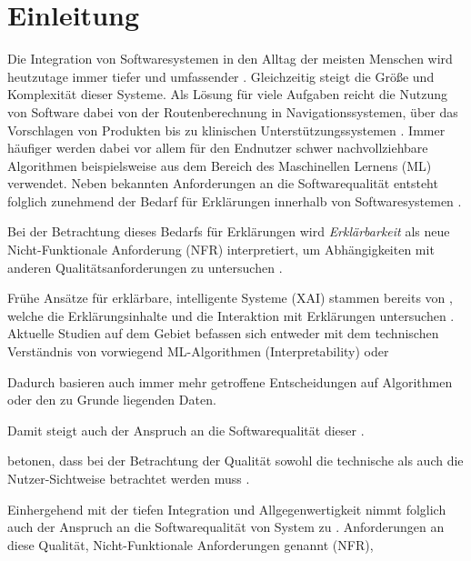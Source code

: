 \chapter{Einleitung}

Die Integration von Softwaresystemen in den Alltag der meisten Menschen wird heutzutage immer tiefer und umfassender \cite{carvalho2020developers}.  Gleichzeitig steigt die Größe und Komplexität dieser Systeme. Als Lösung für viele Aufgaben reicht die Nutzung von Software dabei von der Routenberechnung in Navigationssystemen, über das Vorschlagen von Produkten bis zu klinischen Unterstützungssystemen \cite{chazette2020explainability, tintarev2015explaining, cypko2017guide}. Immer häufiger werden dabei vor allem für den Endnutzer schwer nachvollziehbare Algorithmen beispielsweise aus dem Bereich des Maschinellen Lernens (ML) verwendet. Neben bekannten Anforderungen an die Softwarequalität \cite{international2011iso} entsteht folglich zunehmend der Bedarf für Erklärungen innerhalb von Softwaresystemen \cite{chazette_end-users_nodate}.

Bei der Betrachtung dieses Bedarfs für Erklärungen wird \textit{Erklärbarkeit} als neue Nicht-Funktionale Anforderung (NFR) interpretiert, um Abhängigkeiten mit anderen Qualitätsanforderungen zu untersuchen \cite{chazette2020explainability, kohl_explainability_2019}.

Frühe Ansätze für erklärbare, intelligente Systeme (XAI) stammen bereits von \citeauthor{byrne1991construction, cawsey1991generating}, welche die Erklärungsinhalte \cite{byrne1991construction} und die Interaktion mit Erklärungen untersuchen \cite{cawsey1991generating}. Aktuelle Studien auf dem Gebiet befassen sich entweder mit dem technischen Verständnis von vorwiegend ML-Algorithmen (Interpretability) \cite{gilpin_explaining_2018, fong_interpretable_2017, samek_towards_2019} oder 



Dadurch basieren auch immer mehr getroffene Entscheidungen auf Algorithmen oder den zu Grunde liegenden Daten.





Damit steigt auch der Anspruch an die Softwarequalität dieser \cite{schneider2012abenteuer}. 


\citeauthor{ehsan_human-centered_2020} betonen, dass bei der Betrachtung der Qualität sowohl die technische als auch die Nutzer-Sichtweise betrachtet werden muss \cite{ehsan_human-centered_2020}. 

Einhergehend mit der tiefen Integration und Allgegenwertigkeit nimmt folglich auch der Anspruch an die Softwarequalität von System zu \cite{schneider2012abenteuer}. Anforderungen an diese Qualität, \glqq Nicht-Funktionale Anforderungen genannt\grqq{} (NFR),

